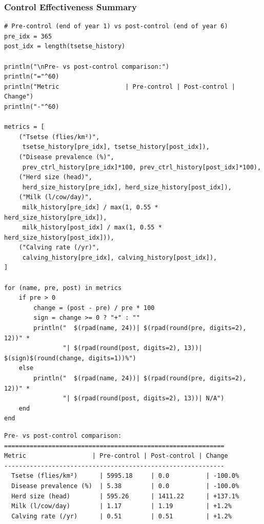 \subsubsection{Control Effectiveness Summary}



\label{1599135209910330121}{}



\begin{verbatim}
# Pre-control (end of year 1) vs post-control (end of year 6)
pre_idx = 365
post_idx = length(tsetse_history)

println("\nPre- vs post-control comparison:")
println("="^60)
println("Metric                  | Pre-control | Post-control | Change")
println("-"^60)

metrics = [
    ("Tsetse (flies/km²)",
     tsetse_history[pre_idx], tsetse_history[post_idx]),
    ("Disease prevalence (%)",
     prev_ctrl_history[pre_idx]*100, prev_ctrl_history[post_idx]*100),
    ("Herd size (head)",
     herd_size_history[pre_idx], herd_size_history[post_idx]),
    ("Milk (l/cow/day)",
     milk_history[pre_idx] / max(1, 0.55 * herd_size_history[pre_idx]),
     milk_history[post_idx] / max(1, 0.55 * herd_size_history[post_idx])),
    ("Calving rate (/yr)",
     calving_history[pre_idx], calving_history[post_idx]),
]

for (name, pre, post) in metrics
    if pre > 0
        change = (post - pre) / pre * 100
        sign = change >= 0 ? "+" : ""
        println("  $(rpad(name, 24))| $(rpad(round(pre, digits=2), 12))" *
                "| $(rpad(round(post, digits=2), 13))| $(sign)$(round(change, digits=1))%")
    else
        println("  $(rpad(name, 24))| $(rpad(round(pre, digits=2), 12))" *
                "| $(rpad(round(post, digits=2), 13))| N/A")
    end
end
\end{verbatim}




\begin{verbatim}
Pre- vs post-control comparison:
============================================================
Metric                  | Pre-control | Post-control | Change
------------------------------------------------------------
  Tsetse (flies/km²)      | 5995.18     | 0.0          | -100.0%
  Disease prevalence (%)  | 5.38        | 0.0          | -100.0%
  Herd size (head)        | 595.26      | 1411.22      | +137.1%
  Milk (l/cow/day)        | 1.17        | 1.19         | +1.2%
  Calving rate (/yr)      | 0.51        | 0.51         | +1.2%
\end{verbatim}




